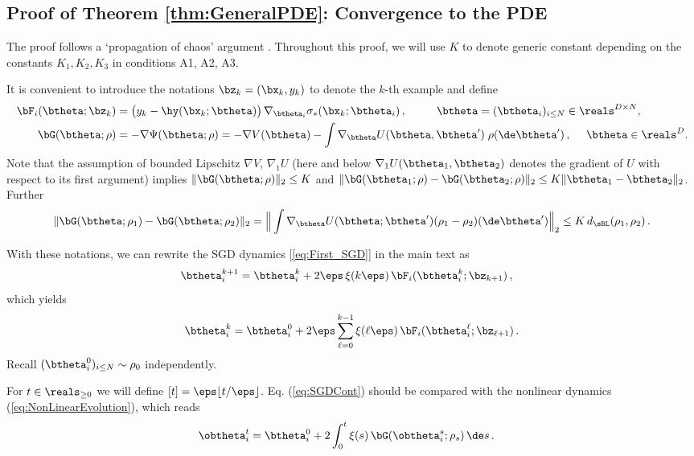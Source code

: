 \documentclass[11pt]{article}
\begin{document}
\subsection{Proof of Theorem \ref{thm:GeneralPDE}: Convergence to the PDE}
\label{sec:ProofPDE}

The proof follows a `propagation of chaos' argument
\cite{sznitman1991topics}. Throughout this proof, we will use $K$ to denote generic constant depending on the constants $K_1, K_2, K_3$ in conditions
{\sf A1}, {\sf A2}, {\sf A3}.

It is convenient to introduce the notations $\bz_k = (\bx_k,y_k)$ to denote the $k$-th example and define
%
\begin{align}
%
\bF_i(\btheta;\bz_k) &= \big(y_k - \hy(\bx_k;\btheta)\big)\,\nabla_{\btheta_i}\sigma_*(\bx_k;\btheta_i)\,,~~~~~~~~ \btheta = (\btheta_i)_{i \le N} \in \reals^{D \times N}, \\
\bG(\btheta;\rho) &= -\nabla \Psi(\btheta;\rho) = -\nabla V(\btheta) -\int \nabla_{\btheta}U(\btheta,\btheta') \; \rho(\de\btheta')\,, ~~~~ \btheta \in \reals^D.
%
\end{align}
% 
Note that the assumption of bounded Lipschitz $\nabla V$, $\nabla_1 U$ (here and below $\nabla_1 U(\btheta_1,\btheta_2)$ denotes the gradient of $U$ with respect to its first argument) implies $\|\bG(\btheta;\rho)\|_2\le K$ and $\|\bG(\btheta_1;\rho)-\bG(\btheta_2;\rho)\|_2\le K\|\btheta_1-\btheta_2\|_2$.  Further
%
\begin{align}
%
\|\bG(\btheta;\rho_1)-\bG(\btheta;\rho_2)\|_2= \Big\|\int \nabla_{\btheta} U(\btheta;\btheta') (\rho_1-\rho_2)(\de\btheta')\Big\|_2\le K\, d_{\sBL}(\rho_1,\rho_2)\, .
\label{eq:LipschitzG}
%
\end{align}
%


With these notations, we can rewrite the SGD dynamics [\ref{eq:First_SGD}] in the main text  as
%
\begin{align}
%
\btheta_i^{k+1}& = \btheta_i^{k}+2\eps\, \xi(k\eps) \, \bF_i(\btheta_i^k;\bz_{k+1})\, ,
%
\end{align}
%
which yields
%
\begin{align}
%
\btheta^k_i = \btheta^0_i +2\eps\sum_{\ell=0}^{k-1}\xi(\ell\eps)\, \bF_i(\btheta_i^{\ell};\bz_{\ell+1})\, .\label{eq:SGDCont}
%
\end{align}
%
Recall $(\btheta^0_i)_{i \le N} \sim \rho_0$ independently. 

For $t\in\reals_{\ge 0}$ we will define $[t] = \eps\lfloor t/\eps\rfloor$. Eq. (\ref{eq:SGDCont}) should be compared with the nonlinear dynamics 
(\ref{eq:NonLinearEvolution}), which reads
%
\begin{align}\label{eq:NonLinearEvolution2}
%
\obtheta^t_i &=\btheta^0_i+2\int_{0}^t\xi(s)\, \bG(\obtheta_i^s;\rho_s)\, \de s\, .
%
\end{align}
%
\end{document}
